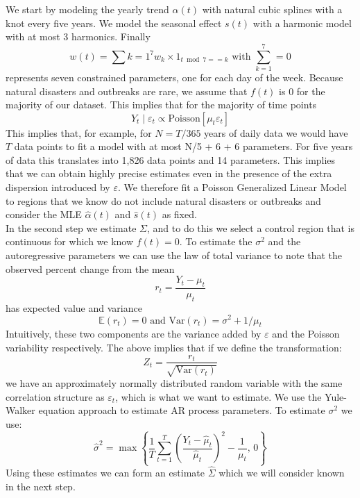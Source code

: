 \documentclass[11pt]{article}
\begin{document}
We start by modeling  the yearly trend $\alpha(t)$ with natural cubic splines with a knot every five years. We model the seasonal effect $s(t)$ with a harmonic model with at most 3 harmonics. Finally
\begin{equation*}
    w(t) = \sum{k=1}^7 w_k \times 1_{t \bmod 7  == k} \mbox{ with } \sum_{k=1}^7 = 0
\end{equation*}
represents seven constrained parameters, one for each day of the week. Because natural disasters and outbreaks are rare, we assume that $f(t)$ is 0 for the majority of our dataset. This implies that for the majority of time points
\begin{equation*}
    Y_t \mid \varepsilon_t \propto \mbox{Poisson}[ \mu_t  \varepsilon_t ]
\end{equation*}
This implies that, for example, for $N = T / 365$ years of daily data we would have $T$ data points to fit a model with at most N/5 + 6 + 6 parameters. For five years of data this translates into 1,826 data points and 14 parameters. This implies that we can obtain highly precise estimates even in the presence of the extra dispersion introduced by $\varepsilon$.  We therefore fit a Poisson Generalized Linear Model to regions that we know do not include natural disasters or outbreaks and consider the MLE $\hat{\alpha}(t)$ and $\hat{s}(t)$ as fixed.  \\

In the second step we estimate $\Sigma$, and to do this we select a control region that is continuous for which we know $f(t)=0$. To estimate the $\sigma^2$ and the autoregressive parameters we can use the law of total variance to note that the observed percent change from the mean
\begin{equation*}
    r_t = \frac{Y_t - \mu_t}{\mu_t}
\end{equation*}
has expected value and variance
\begin{equation*}
    \mathbb{E}\left(r_t \right) = 0 \mbox{ and } \mbox{Var}\left(r_t\right)= \sigma^2 + 1/\mu_t
\end{equation*}
Intuitively, these two components are the variance added by $\varepsilon$ and the Poisson variability respectively. The above implies that if we define the transformation:
\begin{equation*}
    Z_t = \frac{r_t}{\sqrt{\mbox{Var}\left(r_t\right)}}
\end{equation*}
we have an approximately normally distributed random variable with the same correlation structure as $\varepsilon_t$, which is what we want to estimate. We use the Yule-Walker equation approach to estimate AR process parameters. To estimate $\sigma^2$ we use:
\begin{equation*}
    \hat{\sigma}^2 = \max\left\{ \frac{1}{T}\sum_{t=1}^T  \left(\frac{Y_t - \hat{\mu}_t}{\hat{\mu}_t}\right)^2  - \frac{1}{\mu_t}, \, 0\right\}
\end{equation*}
Using these estimates we can form an estimate $\hat{\Sigma}$ which we will consider known in the next step. \\
\end{document}
